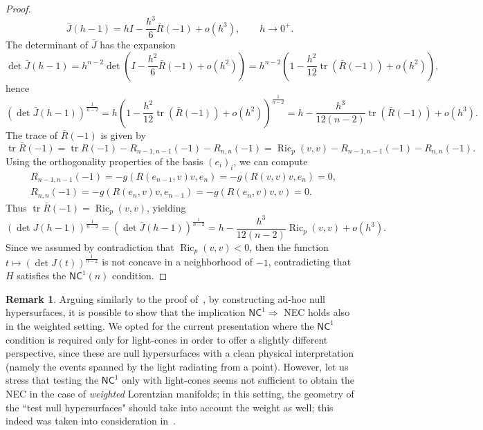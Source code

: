 \documentclass[12pt,a4paper]{amsart}
\theoremstyle{plain}
\theoremstyle{definition}
\newtheorem{remark}[lemma]{Remark}
\numberwithin{equation}{section}
\DeclareMathOperator{\Ric}{Ric}
\DeclareMathOperator{\tr}{tr}
\newcommand{\NC}{\mathsf{NC}}
\begin{document}
\begin{proof}
\begin{equation*}
      \bar J(h-1)
    =
    hI
    -\frac{h^3}{6} \bar R(-1)
    +
    o(h^3)
    ,
    \qquad
    h\to 0^+
    .
  \end{equation*}
  The determinant of $\bar{J}$ has the expansion
  \begin{equation*}
    \det\bar J(h-1)
    =
    h^{n-2}
    \det\left(
      I-\frac{h^2}{6} \bar R(-1)+o(h^2)
      \right)
    =
    h^{n-2}
    \left(
      1-\frac{h^2}{12}
      \tr( \bar R(-1))
      +
      o(h^2)
    \right)
    ,
  \end{equation*}
  hence
  \begin{equation*}
        (\det\bar J(h-1))^{\frac{1}{n-2}}
    =
    h
    \left(
      1-\frac{h^2}{12}
    \tr( \bar R(-1))
    +
    o(h^2)
    \right)^{\frac{1}{n-2}}
    =
    h
    -\frac{h^3}{12(n-2)}
    \tr( \bar R(-1))
    +
    o(h^3)
    .
  \end{equation*}
  The trace of $\bar R(-1)$ is given by
  \begin{equation*}
    \tr \bar R(-1)
    =
    \tr R(-1)
    -R_{n-1,n-1}(-1)
    -R_{n,n}(-1)
    =
    \Ric_p(v,v)
    -R_{n-1,n-1}(-1)
    -R_{n,n}(-1)
    .
  \end{equation*}
  Using the orthogonality properties of the basis $(e_i)_i$, we can
  compute 
  \begin{align*}
    &
    R_{n-1,n-1}(-1)
    =
    -
    g(R(e_{n-1},v)v,e_{n})
    =
    -
    g(R(v,v)v,e_{n})
      =0
      ,
    \\
    &
    R_{n,n}(-1)
    =
    -
    g(R(e_{n},v)v,e_{n-1})
    =
    -
    g(R(e_{n},v)v,v)
      =0.
  \end{align*}
  Thus $\tr \bar R(-1)=\Ric_p(v,v)$, yielding
  \begin{equation*}
    (\det J(h-1))^{\frac{1}{n-2}}
    =
    (\det\bar J(h-1))^{\frac{1}{n-2}}
    =
    h
    -\frac{h^3}{12(n-2)}
    \Ric_p(v,v)
    +
    o(h^3)
    .
  \end{equation*}
  Since we assumed by contradiction that $\Ric_p(v,v)<0$, then the
  function $t\mapsto (\det J(t))^{\frac{1}{n-2}}$ is not concave in a
  neighborhood of $-1$, contradicting that $H$ satisfies the $\NC^1(n)$ condition.
\end{proof}


\begin{remark}
Arguing similarly to the proof of~\cite[Theorem 3.9]{Ket24}, by constructing ad-hoc null hypersurfaces, it is possible to show that the implication $\NC^1\Rightarrow$ NEC holds also in the weighted setting. We opted for the current presentation where the $\NC^1$ condition is required only for light-cones in order to offer a slightly different perspective, since these are null hypersurfaces with a clean
physical interpretation (namely the events spanned by the light radiating from a point). However, let us stress that testing the $\NC^1$ only with light-cones seems not sufficient to obtain the NEC in the case of \emph{weighted} Lorentzian manifolds; in this setting, the geometry of the ``test null hypersurfaces" should take into account the weight as well; this indeed was taken into consideration in~\cite[Theorem 3.9]{Ket24}.
\end{remark}
\end{document}
